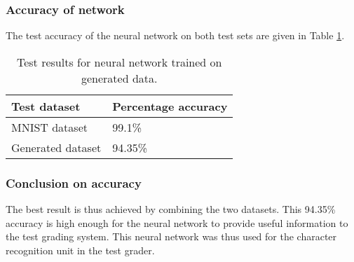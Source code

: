 \subsubsection{Accuracy of network}
The test accuracy of the neural network on both test sets are given in Table \ref{tbl:nnResult3}.

\begin{table}
\caption{Test results for neural network trained on generated data.} \label{tbl:nnResult3}
  \centering
\begin{tabular}{|p{4cm}|p{5cm}|}
\hline
\textbf{Test dataset}&\textbf{Percentage accuracy}\\
\hline
MNIST dataset&99.1\%\\
\hline
Generated dataset&94.35\%\\
\hline
\end{tabular}
\end{table}

\subsubsection{Conclusion on accuracy}
The best result is thus achieved by combining the two datasets. This 94.35\% accuracy is high enough for the neural network to provide useful information to the test grading system. This neural network was thus used for the character recognition unit in the test grader.